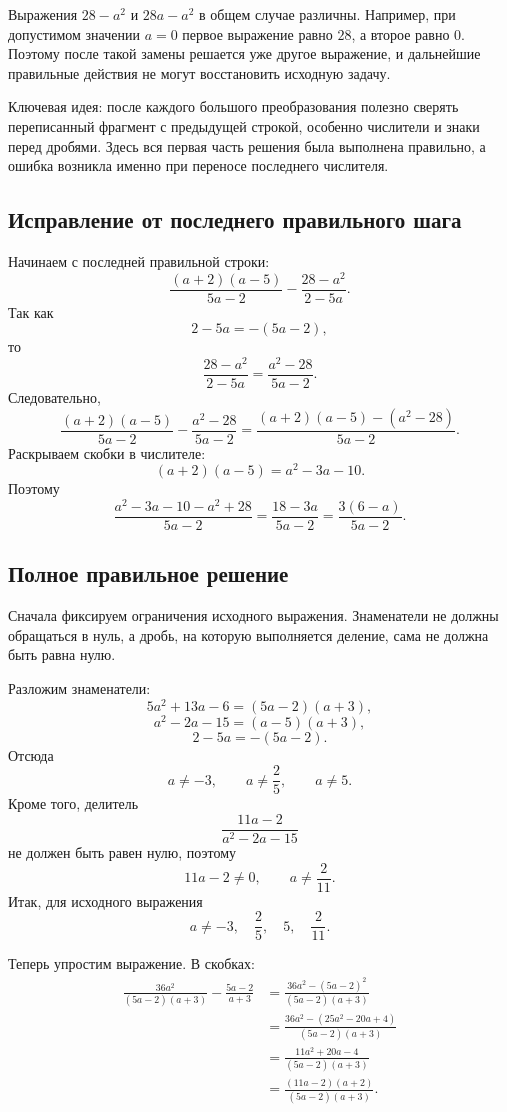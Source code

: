 \documentclass[12pt,a4paper]{article}
\begin{document}
Выражения $28-a^2$ и $28a-a^2$ в общем случае различны. Например, при допустимом значении $a=0$ первое выражение равно $28$, а второе равно $0$. Поэтому после такой замены решается уже другое выражение, и дальнейшие правильные действия не могут восстановить исходную задачу.

\textcolor{blue!60!black}{Ключевая идея:} после каждого большого преобразования полезно сверять переписанный фрагмент с предыдущей строкой, особенно числители и знаки перед дробями. Здесь вся первая часть решения была выполнена правильно, а ошибка возникла именно при переносе последнего числителя.

\subsection*{Исправление от последнего правильного шага}
Начинаем с последней правильной строки:
\[
\frac{(a+2)(a-5)}{5a-2}
-
\frac{28-a^2}{2-5a}.
\]
Так как
\[
2-5a=-(5a-2),
\]
то
\[
\frac{28-a^2}{2-5a}
=
\frac{a^2-28}{5a-2}.
\]
Следовательно,
\[
\frac{(a+2)(a-5)}{5a-2}
-
\frac{a^2-28}{5a-2}
=
\frac{(a+2)(a-5)-(a^2-28)}{5a-2}.
\]
Раскрываем скобки в числителе:
\[
(a+2)(a-5)=a^2-3a-10.
\]
Поэтому
\[
\frac{a^2-3a-10-a^2+28}{5a-2}
=
\frac{18-3a}{5a-2}
=
\frac{3(6-a)}{5a-2}.
\]

\subsection*{Полное правильное решение}
Сначала фиксируем ограничения исходного выражения. Знаменатели не должны обращаться в нуль, а дробь, на которую выполняется деление, сама не должна быть равна нулю.

Разложим знаменатели:
\[
5a^2+13a-6=(5a-2)(a+3),
\]
\[
a^2-2a-15=(a-5)(a+3),
\]
\[
2-5a=-(5a-2).
\]
Отсюда
\[
a\ne -3,\qquad a\ne \frac25,\qquad a\ne5.
\]
Кроме того, делитель
\[
\frac{11a-2}{a^2-2a-15}
\]
не должен быть равен нулю, поэтому
\[
11a-2\ne0,
\qquad
 a\ne\frac{2}{11}.
\]
Итак, для исходного выражения
\[
a\ne -3,\quad \frac25,\quad 5,\quad \frac{2}{11}.
\]

Теперь упростим выражение. В скобках:
\begin{align*}
\frac{36a^2}{(5a-2)(a+3)}
-
\frac{5a-2}{a+3}
&=
\frac{36a^2-(5a-2)^2}{(5a-2)(a+3)}\\
&=
\frac{36a^2-(25a^2-20a+4)}{(5a-2)(a+3)}\\
&=
\frac{11a^2+20a-4}{(5a-2)(a+3)}\\
&=
\frac{(11a-2)(a+2)}{(5a-2)(a+3)}.
\end{align*}
\end{document}
